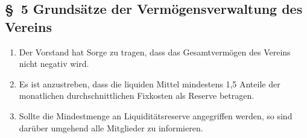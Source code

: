 \documentclass[10pt,a4paper]{article}
\begin{document}
\subsection*{\S \ 5 Grunds{\"a}tze der Verm{\"o}gensverwaltung des Vereins}
\begin{enumerate}
\item Der Vorstand hat Sorge zu tragen, dass das Gesamtverm{\"o}gen des Vereins nicht negativ wird.
\item Es ist anzustreben, dass die liquiden Mittel mindestens 1,5 Anteile der monatlichen durchschnittlichen Fixkosten als Reserve betragen.
\item Sollte die Mindestmenge an Liquidit{\"a}tsreserve angegriffen werden, so sind dar{\"u}ber umgehend alle Mitglieder zu informieren.
\end{enumerate}

%
%
\end{document}
